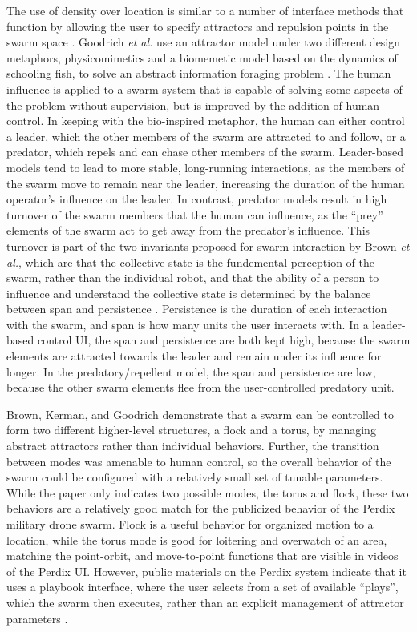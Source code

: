 The use of density over location is similar to a number of interface methods that function by allowing the user to specify attractors and repulsion points in the swarm space \citep{goodrich2011toward, brown2014human, vasile2011integrating, kira2009exerting}. 
Goodrich \emph{et al.} use an attractor model under two different design metaphors, physicomimetics and a biomemetic model based on the dynamics of schooling fish, to solve an abstract information foraging problem \citep{goodrich2011toward}. 
The human influence is applied to a swarm system that is capable of solving some aspects of the problem without supervision, but is improved by the addition of human control. 
In keeping with the bio-inspired metaphor, the human can either control a leader, which the other members of the swarm are attracted to and follow, or a predator, which repels and can chase other members of the swarm. 
Leader-based models tend to lead to more stable, long-running interactions, as the members of the swarm move to remain near the leader, increasing the duration of the human operator's influence on the leader. 
In contrast, predator models result in high turnover of the swarm members that the human can influence, as the ``prey'' elements of the swarm act to get away from the predator's influence. 
This turnover is part of the two invariants proposed for swarm interaction by Brown \emph{et al.}, which are that the collective state is the fundemental perception of the swarm, rather than the individual robot, and that the ability of a person to influence and understand the collective state is determined by the balance between span and persistence \citep{brown2015two}. 
Persistence is the duration of each interaction with the swarm, and span is how many units the user interacts with. 
In a leader-based control UI, the span and persistence are both kept high, because the swarm elements are attracted towards the leader and remain under its influence for longer. 
In the predatory/repellent model, the span and persistence are low, because the other swarm elements flee from the user-controlled predatory unit. 

Brown, Kerman, and Goodrich demonstrate that a swarm can be controlled to form two different higher-level structures, a flock and a torus, by managing abstract attractors rather than individual behaviors. 
Further, the transition between modes was amenable to human control, so the overall behavior of the swarm could be configured with a relatively small set of tunable parameters. 
While the paper only indicates two possible modes, the torus and flock, these two behaviors are a relatively good match for the publicized behavior of the Perdix military drone swarm. 
Flock is a useful behavior for organized motion to a location, while the torus mode is good for loitering and overwatch of an area, matching the point-orbit, and move-to-point functions that are visible in videos of the Perdix UI. 
However, public materials on the Perdix system indicate that it uses a playbook interface, where the user selects from a set of available ``plays'', which the swarm then executes, rather than an explicit management of attractor parameters \citep{PerdixFactsheet}. 

